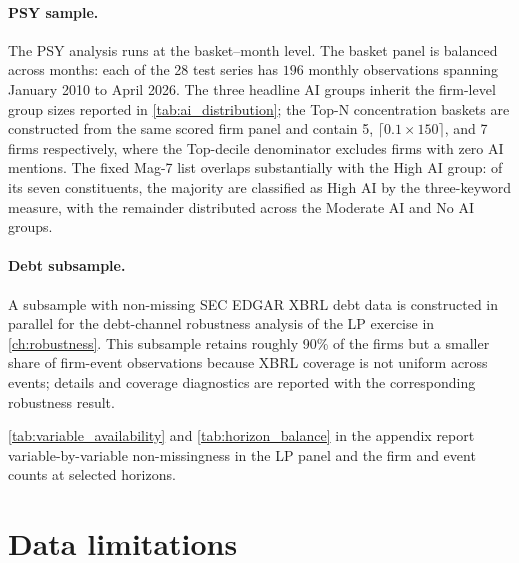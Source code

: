 \paragraph{PSY sample.} The PSY analysis runs at the basket--month level. The basket panel is balanced across months: each of the 28 test series has $196$ monthly observations spanning January 2010 to April 2026. The three headline AI groups inherit the firm-level group sizes reported in \cref{tab:ai_distribution}; the Top-N concentration baskets are constructed from the same scored firm panel and contain 5, $\lceil 0.1 \times 150 \rceil$, and 7 firms respectively, where the Top-decile denominator excludes firms with zero AI mentions. The fixed Mag-7 list overlaps substantially with the High AI group: of its seven constituents, the majority are classified as High AI by the three-keyword measure, with the remainder distributed across the Moderate AI and No AI groups.

\paragraph{Debt subsample.} A subsample with non-missing SEC EDGAR XBRL debt data is constructed in parallel for the debt-channel robustness analysis of the LP exercise in \cref{ch:robustness}. This subsample retains roughly 90\% of the firms but a smaller share of firm-event observations because XBRL coverage is not uniform across events; details and coverage diagnostics are reported with the corresponding robustness result.

\cref{tab:variable_availability} and \cref{tab:horizon_balance} in the appendix report variable-by-variable non-missingness in the LP panel and the firm and event counts at selected horizons.

\section{Data limitations}
\label{sec:data-limitations}

